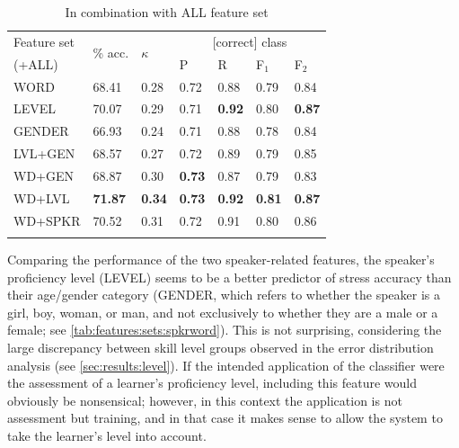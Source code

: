 \begin{table}[tb]
			\begin{subtable}{\textwidth}
			\centering
			\caption{In combination with ALL feature set}
			\begin{tabularx}{.8\textwidth}{lXXXXXX}			
			\toprule
			Feature set & \multirow{2}{*}{\% acc.} & \multirow{2}{*}{$\kappa$} & \multicolumn{4}{c}{[correct] class} \\
			 \cmidrule(lr){4-7}
			(+ALL)& & & P & R & F$_1$ & F$_2$ \\
			\midrule
WORD	&	68.41	&	0.28	&	0.72	&	0.88	&	0.79	&	0.84	\\
LEVEL	&	70.07	&	0.29	&	0.71	&	\textbf{0.92}	&	0.80	&	\textbf{0.87}	\\
GENDER	&	66.93	&	0.24	&	0.71	&	0.88	&	0.78	&	0.84	\\
\addlinespace													
LVL+GEN	&	68.57	&	0.27	&	0.72	&	0.89	&	0.79	&	0.85	\\
WD+GEN	&	68.87	&	0.30	&	\textbf{0.73}	&	0.87	&	0.79	&	0.83	\\
WD+LVL	&	\textbf{71.87}	&	\textbf{0.34}	&	\textbf{0.73}	&	\textbf{0.92}	&	\textbf{0.81}	&	\textbf{0.87}	\\		\addlinespace								
WD+SPKR	&	70.52	&	0.31	&	0.72	&	0.91	&	0.80	&	0.86	\\
			\bottomrule
			\label{tab:results:spkrword:all}
			\end{tabularx}
		\end{subtable}
		
		\label{tab:results:spkrword}
	\end{table}
	
	Comparing the performance of the two speaker-related features, the speaker's proficiency level (LEVEL) seems to be a better predictor of stress accuracy than their age/gender category (GENDER, which refers to whether the speaker is a girl, boy, woman, or man, and not exclusively to whether they are a male or a female; see \cref{tab:features:sets:spkrword}). This is not surprising, considering the large discrepancy between skill level groups observed in the error distribution analysis (see \cref{sec:results:level}). If the intended application of the classifier were the assessment of a learner's proficiency level, including this feature would obviously be nonsensical; however, in this context the application is not assessment but training, and in that case it makes sense to allow the system to take the learner's level into account. 
		
